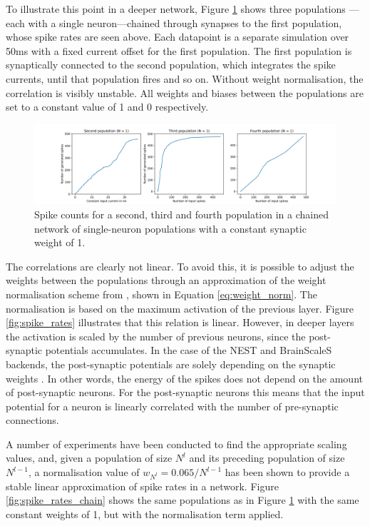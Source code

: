 To illustrate this point in a deeper network, Figure
\ref{fig:spike_rates_not_weighted} shows
three populations
---each with a single neuron---chained
through synapses to the first population, whose spike rates are seen above.
Each datapoint is a separate simulation over 50ms with a fixed
current offset for the first population.
The first population is synaptically connected to the second population, which 
integrates the spike currents, until that population fires and so on.
Without weight normalisation, the correlation is visibly unstable.
All weights and biases between the populations are set to a constant value of 1
and 0 respectively.

\begin{figure}
  \includegraphics[width=\linewidth]{images/spike_rate_not_weighted.png}
  \caption{Spike counts for a second, third and fourth population in a chained network of
  single-neuron populations with a constant synaptic weight of 1.}
  \label{fig:spike_rates_not_weighted}
\end{figure}

The correlations are clearly not linear.
To avoid this, it is possible to adjust the weights between the populations
through an approximation of
the weight normalisation scheme from \textcite{Rueckauer2017}, shown in Equation
\ref{eq:weight_norm}.
The normalisation is based on the maximum activation of the previous layer.
Figure \ref{fig:spike_rates} illustrates that this relation is linear.
However, in deeper layers the activation is scaled by the number of previous
neurons, since the post-synaptic potentials accumulates.
In the case of the NEST and BrainScaleS backends,
the post-synaptic potentials are solely depending on the synaptic weights
\cite{Gewaltig2007, Schmitt2017}.
In other words, the energy of the spikes does not depend on the amount of post-synaptic
neurons.
For the post-synaptic neurons this means that the input potential for a neuron
is linearly correlated with the number of pre-synaptic connections.

A number of experiments have been conducted to find the appropriate scaling values,
and, given a population of size $N^l$ and its preceding population of size $N^{l-1}$,
a normalisation value of $w_{N^l} = 0.065 / N^{l-1}$
has been shown to provide a stable linear approximation of spike rates in a
network.
Figure \ref{fig:spike_rates_chain} shows the same populations as in 
Figure \ref{fig:spike_rates_not_weighted} with the same constant weights of 1, but with
the normalisation term applied.


